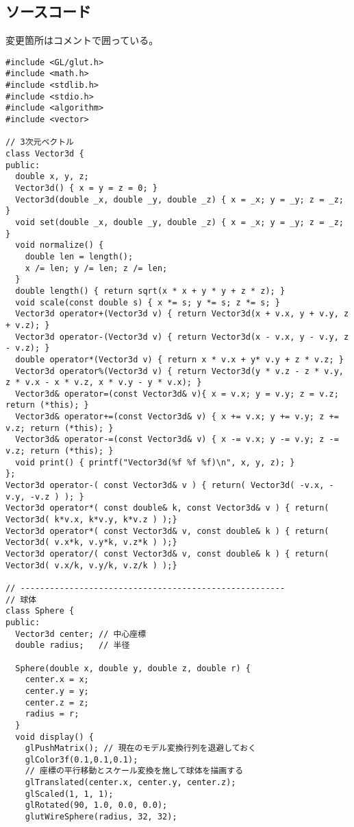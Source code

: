 \documentclass{scrartcl}
\begin{document}
\subsection{ソースコード}
\label{sec:orgc692100}
変更箇所はコメントで囲っている。\\
\begin{verbatim}
#include <GL/glut.h>
#include <math.h>   
#include <stdlib.h> 
#include <stdio.h> 
#include <algorithm>
#include <vector>

// 3次元ベクトル
class Vector3d {
public:
  double x, y, z;
  Vector3d() { x = y = z = 0; }
  Vector3d(double _x, double _y, double _z) { x = _x; y = _y; z = _z; }
  void set(double _x, double _y, double _z) { x = _x; y = _y; z = _z; }
  void normalize() {
    double len = length();
    x /= len; y /= len; z /= len;
  }
  double length() { return sqrt(x * x + y * y + z * z); }
  void scale(const double s) { x *= s; y *= s; z *= s; }
  Vector3d operator+(Vector3d v) { return Vector3d(x + v.x, y + v.y, z + v.z); }
  Vector3d operator-(Vector3d v) { return Vector3d(x - v.x, y - v.y, z - v.z); }
  double operator*(Vector3d v) { return x * v.x + y* v.y + z * v.z; }
  Vector3d operator%(Vector3d v) { return Vector3d(y * v.z - z * v.y, z * v.x - x * v.z, x * v.y - y * v.x); }
  Vector3d& operator=(const Vector3d& v){ x = v.x; y = v.y; z = v.z; return (*this); }
  Vector3d& operator+=(const Vector3d& v) { x += v.x; y += v.y; z += v.z; return (*this); }
  Vector3d& operator-=(const Vector3d& v) { x -= v.x; y -= v.y; z -= v.z; return (*this); }
  void print() { printf("Vector3d(%f %f %f)\n", x, y, z); }
};
Vector3d operator-( const Vector3d& v ) { return( Vector3d( -v.x, -v.y, -v.z ) ); }
Vector3d operator*( const double& k, const Vector3d& v ) { return( Vector3d( k*v.x, k*v.y, k*v.z ) );}
Vector3d operator*( const Vector3d& v, const double& k ) { return( Vector3d( v.x*k, v.y*k, v.z*k ) );}
Vector3d operator/( const Vector3d& v, const double& k ) { return( Vector3d( v.x/k, v.y/k, v.z/k ) );}

// ------------------------------------------------------
// 球体
class Sphere {
public:
  Vector3d center; // 中心座標
  double radius;   // 半径

  Sphere(double x, double y, double z, double r) {
    center.x = x;
    center.y = y;
    center.z = z;
    radius = r;
  }
  void display() { 
    glPushMatrix(); // 現在のモデル変換行列を退避しておく
    glColor3f(0.1,0.1,0.1);
    // 座標の平行移動とスケール変換を施して球体を描画する
    glTranslated(center.x, center.y, center.z);
    glScaled(1, 1, 1);
    glRotated(90, 1.0, 0.0, 0.0);
    glutWireSphere(radius, 32, 32);


\end{verbatim}
\end{document}
